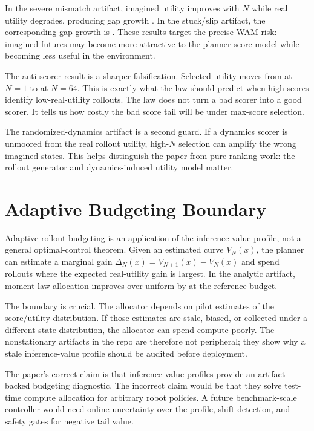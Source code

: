 In the severe mismatch artifact, imagined utility improves with $N$ while real
utility degrades, producing gap growth \VFourWAMSevereGapGrowth{}. In the
stuck/slip artifact, the corresponding gap growth is
\VFourWAMStuckGapGrowth{}. These results target the precise WAM risk:
imagined futures may become more attractive to the planner-score model while
becoming less useful in the environment.

The anti-scorer result is a sharper falsification. Selected utility moves from
\VFourWAMAntiScorerNOne{} at $N=1$ to
\VFourWAMAntiScorerNSixtyFour{} at $N=64$. This is exactly what the law should
predict when high scores identify low-real-utility rollouts. The law does not
turn a bad scorer into a good scorer. It tells us how costly the bad score tail
will be under max-score selection.

The randomized-dynamics artifact is a second guard. If a dynamics scorer is
unmoored from the real rollout utility, high-$N$ selection can amplify the
wrong imagined states. This helps distinguish the paper from pure ranking
work: the rollout generator and dynamics-induced utility model matter.

\section{Adaptive Budgeting Boundary}
\label{app:adaptive-boundary}

Adaptive rollout budgeting is an application of the inference-value profile,
not a general optimal-control theorem. Given an estimated curve $V_N(x)$, the
planner can estimate a marginal gain $\Delta_N(x)=V_{N+1}(x)-V_N(x)$ and spend
rollouts where the expected real-utility gain is largest. In the analytic
artifact, moment-law allocation improves over uniform by
\VFourWAMAdaptiveGain{} at the reference budget.

The boundary is crucial. The allocator depends on pilot estimates of the
score/utility distribution. If those estimates are stale, biased, or collected
under a different state distribution, the allocator can spend compute poorly.
The nonstationary artifacts in the repo are therefore not peripheral; they show
why a stale inference-value profile should be audited before deployment.

The paper's correct claim is that inference-value profiles provide an
artifact-backed budgeting diagnostic. The incorrect claim would be that they
solve test-time compute allocation for arbitrary robot policies. A future
benchmark-scale controller would need online uncertainty over the profile,
shift detection, and safety gates for negative tail value.

